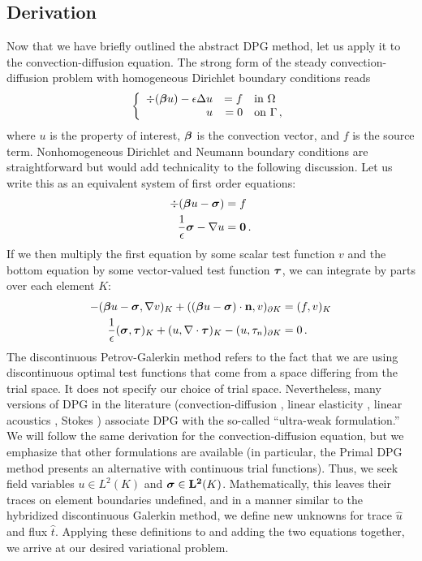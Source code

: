 \documentclass{report}
\begin{document}
\subsection{Derivation}
Now that we have briefly outlined the abstract DPG method, let us apply it to
the convection-diffusion equation. The strong form of the steady
convection-diffusion problem with homogeneous Dirichlet boundary conditions reads
\[
\left\{
\begin{array}[c]{rrl}
\div(\boldsymbol\beta u)-\epsilon\Delta u & =f & \text{in }\Omega\\
u & =0 & \text{on }\Gamma\,,
\end{array}
\right.
\]
where $u$ is the property of interest, $\boldsymbol{\beta}$ is the convection vector,
and $f$ is the source term. Nonhomogeneous Dirichlet and Neumann boundary
conditions are straightforward but would add technicality to the following
discussion. Let us write this as an equivalent system of first
order equations:
\begin{align*}
\div(\boldsymbol\beta u-\boldsymbol\sigma)&=f\\
\frac{1}{\epsilon}\boldsymbol\sigma-\nabla u&=\boldsymbol{0}\,.
\end{align*}
If we then multiply the first equation by some scalar test function $v$ and the
bottom equation by some vector-valued test function $\boldsymbol\tau$, we can integrate by
parts over each element $K$:
\begin{equation}
\label{eq:preultraweak}
\begin{aligned}
-(\boldsymbol\beta u-\boldsymbol\sigma,\nabla v)_K+((\boldsymbol\beta
u-\boldsymbol\sigma)\cdot\mathbf{n},v)_{\partial K}&=(f,v)_K\\
\frac{1}{\epsilon}(\boldsymbol\sigma,\boldsymbol\tau)_K+(u,\nabla\cdot\boldsymbol\tau)_K
-(u,\tau_n)_{\partial K}&=0\,.
\end{aligned}
\end{equation}
The discontinuous Petrov-Galerkin method refers to the fact that we are using
discontinuous optimal test functions that come from a space differing from the
trial space. It does not specify our choice of trial space. Nevertheless, many
versions of DPG in the literature (convection-diffusion \cite{DPG6},
linear elasticity \cite{BramwellDemkowiczGopalakrishnanQiu11}, linear
acoustics \cite{DemkowiczGopalakrishnanMugaZitelli12}, Stokes
\cite{DPGStokes}) associate DPG with the so-called ``ultra-weak formulation.''
We will follow the same derivation for the convection-diffusion equation, but
we emphasize that other formulations are available (in particular, the
Primal DPG\cite{PrimalDPG} method presents an alternative with
continuous trial functions). Thus, we seek field variables $u\in L^2(K)$ and
$\boldsymbol\sigma\in\mathbf{L^2}(K)$. Mathematically, this leaves their traces on element
boundaries undefined, and in a manner similar to the hybridized discontinuous
Galerkin method, we define new unknowns for trace $\hat u$ and flux $\hat t$.
Applying these definitions to  and adding the two
equations together, we arrive at our desired variational problem.
\end{document}
